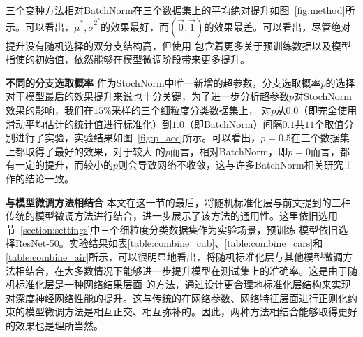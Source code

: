 三个变种方法相对BatchNorm在三个数据集上的平均绝对提升如图~\ref{fig:method}所示。可以看出，$\tilde{\mu}^*, \tilde{\sigma}^{2^*}$的效果最好，而$(\vec{0}, \vec{1})$的效果最差。可以看出，尽管绝对提升没有随机选择的双分支结构高，但使用
包含着更多关于预训练数据以及模型指使的初始值，依然能够在模型微调阶段带来更多提升。

\textbf{不同的分支选取概率 } 作为StochNorm中唯一新增的超参数，分支选取概率$p$的选择对于模型最后的效果提升来说也十分关键，为了进一步分析超参数$p$对StochNorm效果的影响，我们在$15\%$采样的三个细粒度分类数据集上，
对$p$从$0.0$（即完全使用滑动平均估计的统计值进行标准化）到$1.0$（即BatchNorm）间隔$0.1$共$11$个取值分别进行了实验，实验结果如图~\ref{fig:p_acc}所示。可以看出，$p=0.5$在三个数据集上都取得了最好的效果，对于较大
的$p$而言，相对BatchNorm，即$p=0$而言，都有一定的提升，而较小的$p$则会导致网络不收敛，这与许多BatchNorm相关研究工作的结论一致。


\textbf{与模型微调方法相结合 } 本文在这一节的最后，将随机标准化层与前文提到的三种传统的模型微调方法进行结合，进一步展示了该方法的通用性。这里依旧选用节~\ref{section:settings}中三个细粒度分类数据集作为实验场景，预训练
模型依旧选择ResNet-50。实验结果如表\ref{table:combine_cub}、\ref{table:combine_cars}和\ref{table:combine_air}所示，可以很明显地看出，将随机标准化层与其他模型微调方法相结合，在大多数情况下能够进一步提升模型在测试集上的准确率。这是由于随机标准化层是一种网络结果层面
的方法，通过设计更合理地标准化层结构来实现对深度神经网络性能的提升。这与传统的在网络参数、网络特征层面进行正则化约束的模型微调方法是相互正交、相互弥补的。因此，两种方法相结合能够取得更好的效果也是理所当然。


